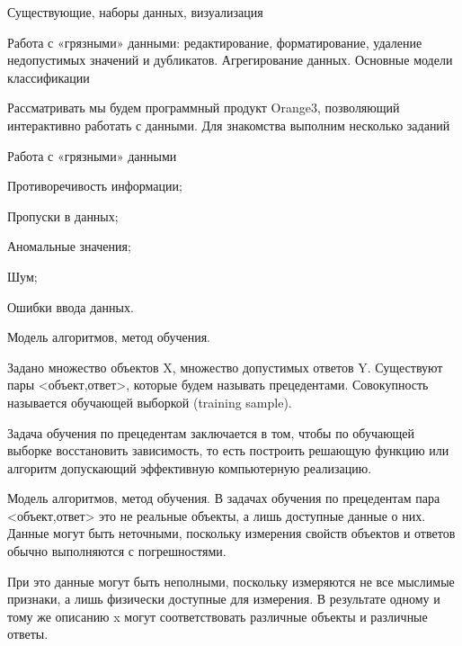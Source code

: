 \documentclass[10pt,pdf,hyperref={unicode}]{beamer}
\begin{document}
\begin{frame}{Существующие, наборы данных, визуализация}

Работа с «грязными» данными: редактирование, форматирование, 
удаление недопустимых значений и дубликатов. 
Агрегирование данных. Основные модели классификации

Рассматривать мы будем  программный продукт Orange3, позволяющий  интерактивно работать с данными.
Для знакомства выполним несколько заданий



\end{frame}

\begin{frame}{Работа с «грязными» данными}

Противоречивость информации;

Пропуски в данных;

Аномальные значения;

Шум;

Ошибки ввода данных. 

\end{frame}



\begin{frame}{Модель алгоритмов, метод обучения.}

Задано множество объектов X, множество допустимых ответов Y. 
Существуют пары <объект,ответ>,  которые будем  называть прецедентами. 
Совокупность  называется обучающей выборкой (training sample).



Задача обучения по прецедентам заключается в том, чтобы по  обучающей выборке 
восстановить зависимость, то есть построить решающую функцию  или алгоритм допускающий эффективную компьютерную 
реализацию.

\end{frame}  

\begin{frame}{Модель алгоритмов, метод обучения.}
В задачах обучения по прецедентам  пара <объект,ответ> 
это не реальные объекты, а лишь доступные данные о них. 
Данные могут быть неточными, поскольку измерения  свойств объектов и ответов обычно
выполняются с погрешностями. 

При это данные могут быть неполными, 
поскольку измеряются не все мыслимые признаки, а лишь физически доступные для измерения.
В результате одному и тому же описанию x могут соответствовать различные объекты и различные ответы. 
\end{frame}  
\end{document}
